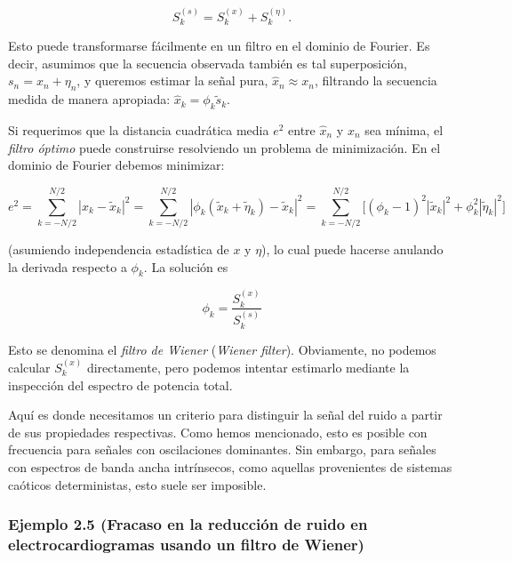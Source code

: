 \documentclass[10pt,a4paper]{book}
\begin{document}
\begin{equation}
S_k^{(s)} = S_k^{(x)} + S_k^{(\eta)}.
\end{equation}

Esto puede transformarse fácilmente en un filtro en el dominio de Fourier. Es decir, asumimos que la secuencia observada también es tal superposición, $s_n = x_n + \eta_n$, y queremos estimar la señal pura, $\hat{x}_n \approx x_n$, filtrando la secuencia medida de manera apropiada: $\hat{x}_k = \phi_k \tilde{s}_k$.  

Si requerimos que la distancia cuadrática media $e^2$ entre $\hat{x}_n$ y $x_n$ sea mínima, el \emph{filtro óptimo} puede construirse resolviendo un problema de minimización. En el dominio de Fourier debemos minimizar:

\begin{equation}
e^2 = \sum_{k=-N/2}^{N/2} |\hat{x}_k - \tilde{x}_k|^2
= \sum_{k=-N/2}^{N/2} |\phi_k(\tilde{x}_k + \tilde{\eta}_k) - \tilde{x}_k|^2
= \sum_{k=-N/2}^{N/2} \Big[ (\phi_k - 1)^2 |\tilde{x}_k|^2 + \phi_k^2 |\tilde{\eta}_k|^2 \Big]
\end{equation}

(asumiendo independencia estadística de $x$ y $\eta$), lo cual puede hacerse anulando la derivada respecto a $\phi_k$. La solución es

\begin{equation}
\phi_k = \frac{S_k^{(x)}}{S_k^{(s)}}
\end{equation}

Esto se denomina el \emph{filtro de Wiener} (\emph{Wiener filter}). Obviamente, no podemos calcular $S_k^{(x)}$ directamente, pero podemos intentar estimarlo mediante la inspección del espectro de potencia total.  

Aquí es donde necesitamos un criterio para distinguir la señal del ruido a partir de sus propiedades respectivas. Como hemos mencionado, esto es posible con frecuencia para señales con oscilaciones dominantes. Sin embargo, para señales con espectros de banda ancha intrínsecos, como aquellas provenientes de sistemas caóticos deterministas, esto suele ser imposible.

\newpage

\subsubsection*{Ejemplo 2.5 (Fracaso en la reducción de ruido en electrocardiogramas usando un filtro de Wiener)}
\end{document}
